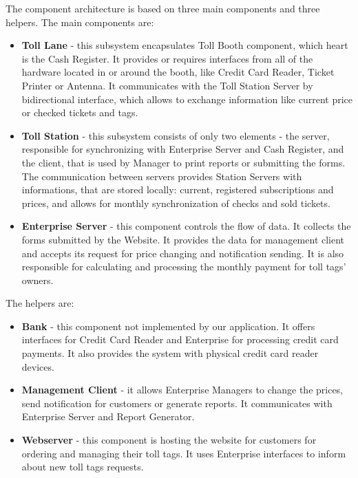 The component architecture is based on three main components and three helpers. 
The main components are:
\begin{itemize}
\item \textbf{Toll Lane} - this subsystem encapsulates Toll Booth component, which heart is the Cash Register. It provides or requires interfaces from all of the hardware located in or around the booth, like Credit Card Reader, Ticket Printer or Antenna. It communicates with the Toll Station Server by bidirectional interface, which allows to exchange information like current price or checked tickets and tags.
\item \textbf{Toll Station} - this subsystem consists of only two elements - the server, responsible for synchronizing with Enterprise Server and Cash Register, and the client, that is used by Manager to print reports or submitting the forms. The communication between servers provides Station Servers with informations, that are stored locally: current, registered subscriptions and prices, and allows for monthly synchronization of checks and sold tickets. 
\item \textbf{Enterprise Server} - this component controls the flow of data. It collects the forms submitted by the Website. It provides the data for management client and accepts its request for price changing and notification sending. It is also responsible for calculating and processing the monthly payment for toll tags' owners.
\end{itemize}
The helpers are:
\begin{itemize}
\item \textbf{Bank} - this component not implemented by our application. It offers interfaces for Credit Card Reader and Enterprise for processing credit card payments. It also provides the system with physical credit card reader devices.
\item \textbf{Management Client} - it allows Enterprise Managers to change the prices, send notification for customers or generate reports. It communicates with Enterprise Server and Report Generator. 
\item \textbf{Webserver} - this component is hosting the website for customers for ordering and managing their toll tags. It uses Enterprise interfaces to inform about new toll tags requests. 
\end{itemize}


